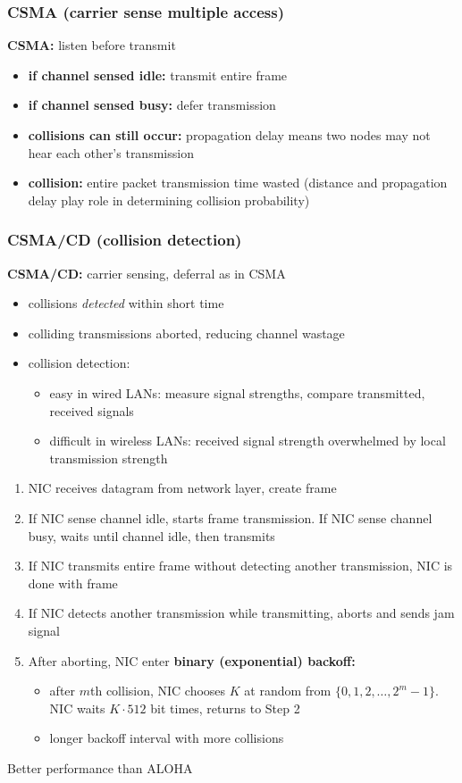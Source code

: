 \subsubsection{CSMA (carrier sense multiple access)}\label{sec:CSMA}
\textbf{CSMA:} listen before transmit
\begin{itemize}
	\item \textbf{if channel sensed idle:} transmit entire frame
	\item \textbf{if channel sensed busy:} defer transmission
	\item \textbf{collisions can still occur:} propagation delay means two nodes may not hear each other's transmission
	\item \textbf{collision:} entire packet transmission time wasted (distance and propagation delay play role in determining collision probability)
\end{itemize}
\subsubsection{CSMA/CD (collision detection)}\label{sec:CSMA/CD}
\textbf{CSMA/CD:} carrier sensing, deferral as in CSMA
\begin{itemize}
	\item collisions \textit{detected} within short time
	\item colliding transmissions aborted, reducing channel wastage
	\item collision detection:
	\begin{itemize}
		\item easy in wired LANs: measure signal strengths, compare transmitted, received signals
		\item difficult in wireless LANs: received signal strength overwhelmed by local transmission strength
	\end{itemize}
\end{itemize}
\begin{enumerate}
	\item NIC receives datagram from network layer, create frame
	\item If NIC sense channel idle, starts frame transmission. If NIC sense channel busy, waits until channel idle, then transmits
	\item If NIC transmits entire frame without detecting another transmission, NIC is done with frame
	\item If NIC detects another transmission while transmitting, aborts and sends jam signal
	\item After aborting, NIC enter \textbf{binary (exponential) backoff:}
	\begin{itemize}
		\item after $m$th collision, NIC chooses $K$ at random from $\{ 0,1,2,\ldots,2^m-1 \}$. NIC waits $K\cdot512$ bit times, returns to Step 2
		\item longer backoff interval with more collisions
	\end{itemize}
\end{enumerate}
\begin{leftbar}
	Better performance than ALOHA
\end{leftbar}

